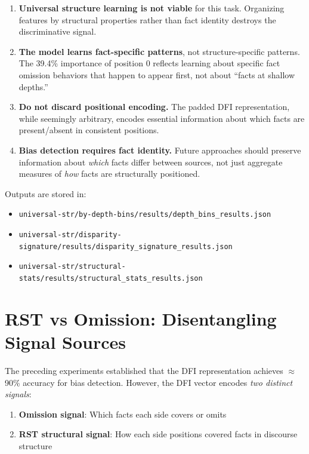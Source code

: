 \documentclass[12pt,a4paper]{article}
\begin{document}
\begin{enumerate}
\item \textbf{Universal structure learning is not viable} for this task. Organizing features
      by structural properties rather than fact identity destroys the discriminative signal.

\item \textbf{The model learns fact-specific patterns}, not structure-specific patterns.
      The 39.4\% importance of position 0 reflects learning about specific fact omission
      behaviors that happen to appear first, not about ``facts at shallow depths.''

\item \textbf{Do not discard positional encoding.} The padded DFI representation, while
      seemingly arbitrary, encodes essential information about which facts are present/absent
      in consistent positions.

\item \textbf{Bias detection requires fact identity.} Future approaches should preserve
      information about \textit{which} facts differ between sources, not just aggregate
      measures of \textit{how} facts are structurally positioned.
\end{enumerate}

Outputs are stored in:
\begin{itemize}
\item \texttt{universal-str/by-depth-bins/results/depth\_bins\_results.json}
\item \texttt{universal-str/disparity-signature/results/disparity\_signature\_results.json}
\item \texttt{universal-str/structural-stats/results/structural\_stats\_results.json}
\end{itemize}

\section{RST vs Omission: Disentangling Signal Sources}

The preceding experiments established that the DFI representation achieves $\approx$90\% accuracy
for bias detection. However, the DFI vector encodes \textit{two distinct signals}:
\begin{enumerate}
\item \textbf{Omission signal}: Which facts each side covers or omits
\item \textbf{RST structural signal}: How each side positions covered facts in discourse structure
\end{enumerate}
\end{document}
